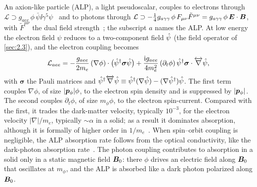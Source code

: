 An axion-like particle (ALP), a light pseudoscalar, couples to electrons through $\mathcal{L} \supset g_{aee}\,\phi\,\bar\psi\ii\gamma^5\psi$~\cite[Eq.~(3)]{mitridate2021dark} and to photons through $\mathcal{L} \supset -\tfrac14 g_{a\gamma\gamma}\,\phi\,F_{\mu\nu}\tilde F^{\mu\nu} = g_{a\gamma\gamma}\,\phi\,\bm{E}\cdot\bm{B}$, with $\tilde F^{\mu\nu}$ the dual field strength~\cite[Eqs.~(2) and (3)]{graham2015experimental}; the subscript $a$ names the ALP. At low energy the electron field $\psi$ reduces to a two-component field $\hat{\psi}$ (the field operator of \cref{sec:2.3}), and the electron coupling becomes~\cite[Eq.~(18) and Table~I]{mitridate2021dark}
\begin{equation}
  \mathcal{L}_{aee} = -\frac{g_{aee}}{2m_e}\,(\nabla\phi)\cdot\bigl(\hat{\psi}^\dagger\boldsymbol{\sigma}\hat{\psi}\bigr)
  + \frac{\mathrm{i} g_{aee}}{4m_e^2}\,(\partial_t\phi)\,\hat{\psi}^\dagger\boldsymbol{\sigma}\cdot\overleftrightarrow{\nabla}\hat{\psi} ,
  \label{eq:1.4-alp}
\end{equation}
with $\boldsymbol{\sigma}$ the Pauli matrices and $\hat{\psi}^\dagger\overleftrightarrow{\nabla}\hat{\psi} \equiv \hat{\psi}^\dagger(\nabla\hat{\psi}) - (\nabla\hat{\psi}^\dagger)\hat{\psi}$. The first term couples $\nabla\phi$, of size $|\bm{p}_\phi|\phi$, to the electron spin density and is suppressed by $|\bm{p}_\phi|$. The second couples $\partial_t\phi$, of size $m_\phi\phi$, to the electron spin-current. Compared with the first, it trades the dark-matter velocity, typically $10^{-3}$, for the electron velocity $|\nabla|/m_e$, typically $\sim \alpha$ in a solid; as a result it dominates absorption, although it is formally of higher order in $1/m_e$~\cite[Sect.~II]{mitridate2021dark}. When spin--orbit coupling is negligible, the ALP absorption rate follows from the optical conductivity, like the dark-photon absorption rate~\cite[Table~I]{mitridate2021dark}. The photon coupling contributes to absorption in a solid only in a static magnetic field $\bm{B}_0$: there $\phi$ drives an electric field along $\bm{B}_0$ that oscillates at $m_\phi$, and the ALP is absorbed like a dark photon polarized along $\bm{B}_0$.

